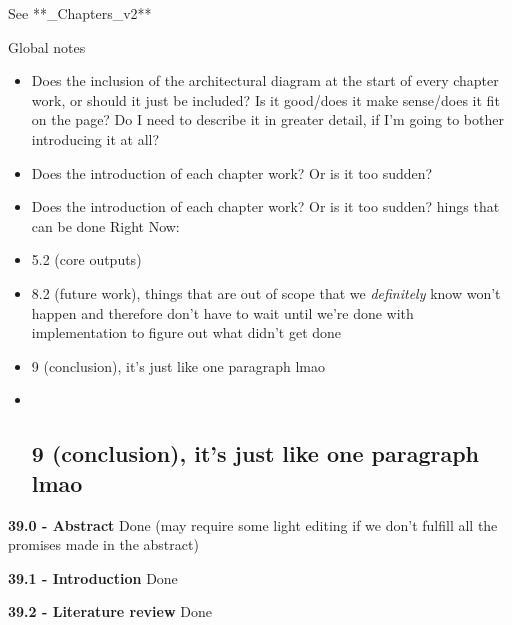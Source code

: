 See **\_Chapters\_v2**

Global notes

\begin{itemize}
\item
  Does the inclusion of the architectural diagram at the start of every
  chapter work, or should it just be included? Is it good/does it make
  sense/does it fit on the page? Do I need to describe it in greater
  detail, if I'm going to bother introducing it at all?
\item
  Does the introduction of each chapter work? Or is it too sudden?
\item
  Does the introduction of each chapter work? Or is it too sudden? hings
  that can be done Right Now:
\item
  5.2 (core outputs)
\item
  8.2 (future work), things that are out of scope that we
  \emph{definitely} know won't happen and therefore don't have to wait
  until we're done with implementation to figure out what didn't get
  done
\item
  9 (conclusion), it's just like one paragraph lmao
\item ~
  \subsection{9 (conclusion), it's just like one paragraph
  lmao}\label{conclusion-its-just-like-one-paragraph-lmao}
\end{itemize}

\textbf{39.0 - Abstract} Done (may require some light editing if we
don't fulfill all the promises made in the abstract)

\textbf{39.1 - Introduction} Done

\textbf{39.2 - Literature review} Done

